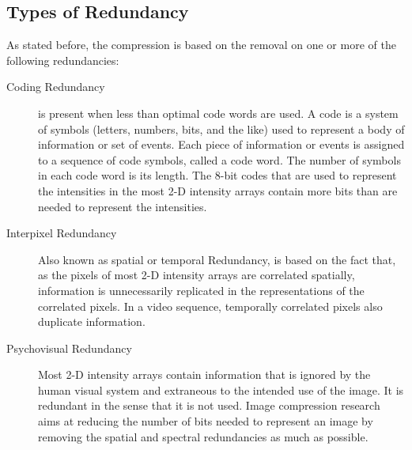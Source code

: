\subsection{Types of Redundancy}
As stated before, the compression is based on the removal on one or more of the following redundancies:
\begin{description}
\item[Coding Redundancy] is present when less than optimal code words are used. A code is a system of symbols (letters, numbers, bits, and the like) used to represent a body of information or set of events. Each piece of information or events is assigned to a sequence of code symbols, called a code word. The number of symbols in each code word is its length. The 8-bit codes that are used to represent the intensities in the most 2-D intensity arrays contain more bits than are needed to represent the intensities.
\item[Interpixel Redundancy] Also known as spatial or temporal Redundancy, is based on the fact that, as the pixels of most 2-D intensity arrays are correlated spatially, information is unnecessarily replicated in the representations of the correlated pixels. In a video sequence, temporally correlated pixels also duplicate information.
\item[Psychovisual Redundancy] Most 2-D intensity arrays contain information that is ignored by the human visual system and extraneous to the intended use of the image. It is redundant in the sense that it is not used. Image compression research aims at reducing the number of bits needed to represent an image by removing the spatial and spectral redundancies as much as possible.
\end{description}

